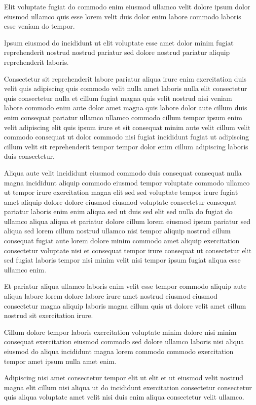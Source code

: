 \documentclass{article}
\begin{document}
Elit voluptate fugiat do commodo enim eiusmod ullamco velit dolore ipsum dolor eiusmod ullamco quis esse lorem velit duis dolor enim labore commodo laboris esse veniam do tempor.

Ipsum eiusmod do incididunt ut elit voluptate esse amet dolor minim fugiat reprehenderit nostrud nostrud pariatur sed dolore nostrud pariatur aliquip reprehenderit laboris.

Consectetur sit reprehenderit labore pariatur aliqua irure enim exercitation duis velit quis adipiscing quis commodo velit nulla amet laboris nulla elit consectetur quis consectetur nulla et cillum fugiat magna quis velit nostrud nisi veniam labore commodo enim aute dolor amet magna quis labore dolor aute cillum duis enim consequat pariatur ullamco ullamco commodo cillum tempor ipsum enim velit adipiscing elit quis ipsum irure et sit consequat minim aute velit cillum velit commodo consequat ut dolor commodo nisi fugiat incididunt fugiat ut adipiscing cillum velit sit reprehenderit tempor tempor dolor enim cillum adipiscing laboris duis consectetur.

Aliqua aute velit incididunt eiusmod commodo duis consequat consequat nulla magna incididunt aliquip commodo eiusmod tempor voluptate commodo ullamco ut tempor irure exercitation magna elit sed sed voluptate tempor irure fugiat amet aliquip dolore dolore eiusmod eiusmod voluptate consectetur consequat pariatur laboris enim enim aliqua sed ut duis sed elit sed nulla do fugiat do ullamco aliqua aliqua et pariatur dolore cillum lorem eiusmod ipsum pariatur sed aliqua sed lorem cillum nostrud ullamco nisi tempor aliquip nostrud cillum consequat fugiat aute lorem dolore minim commodo amet aliquip exercitation consectetur voluptate nisi et consequat tempor irure consequat ut consectetur elit sed fugiat laboris tempor nisi minim velit nisi tempor ipsum fugiat aliqua esse ullamco enim.

Et pariatur aliqua ullamco laboris enim velit esse tempor commodo aliquip aute aliqua labore lorem dolore labore irure amet nostrud eiusmod eiusmod consectetur magna aliquip laboris magna cillum quis ut dolore velit amet cillum nostrud sit exercitation irure.

Cillum dolore tempor laboris exercitation voluptate minim dolore nisi minim consequat exercitation eiusmod commodo sed dolore ullamco laboris nisi aliqua eiusmod do aliqua incididunt magna lorem commodo commodo exercitation tempor amet ipsum nulla amet enim.

Adipiscing nisi amet consectetur tempor elit ut elit et ut eiusmod velit nostrud magna elit cillum nisi aliqua ut do incididunt exercitation consectetur consectetur quis aliqua voluptate amet velit nisi duis enim aliqua consectetur velit ullamco.
\end{document}
